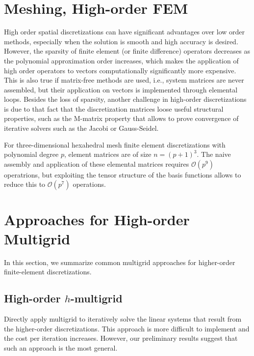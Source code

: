 \documentclass[times]{nlaauth}
\begin{document}
\section{Meshing, High-order FEM}


High order spatial discretizations can have significant advantages
over low order methods, especially when the solution is smooth and
high accuracy is desired. However, the sparsity of finite element (or
finite difference) operators decreases as the polynomial approximation
order increases, which makes the application of high order operators
to vectors computationally significantly more expensive. This is also
true if matrix-free methods are used, i.e., system matrices are never
assembled, but their application on vectors is implemented through
elemental loops.  Besides the loss of sparsity, another challenge in
high-order discretizations is due to that fact that the discretization
matrices loose useful structural properties, such as the M-matrix
property that allows to prove convergence of iterative solvers such as
the Jacobi or Gauss-Seidel.

For three-dimensional hexahedral mesh finite element discretizations
with polynomial degree $p$, element matrices are of size
$n=(p+1)^3$. The naive assembly and application of these elemental
matrices requires $\mathcal O(p^9)$ operatrions, but exploiting the
tensor structure of the basis functions allows to reduce this to
$\mathcal O(p^7)$ operations.




\section{Approaches for High-order Multigrid}


In this section, we summarize common multigrid approaches for
higher-order finite-element discretizations.

\subsection{High-order $h$-multigrid}
Directly apply multigrid to iteratively solve the linear systems that
result from the higher-order discretizations. This approach is more
difficult to implement and the cost per iteration increases. However,
our preliminary results suggest that such an approach is the most
general.
\end{document}
